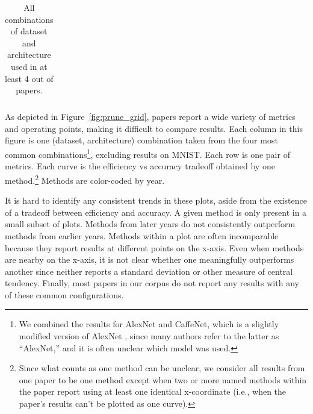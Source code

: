 \begin{table}[t]
\begin{centering}
\begin{tabular}{ll|c}
\end{tabular}
\end{centering}
\caption{All combinations of dataset and architecture used in at least 4 out of \npapers papers.
}
\label{tbl:common_combos}
\vspace*{1mm}
\end{table}

As depicted in Figure~\ref{fig:prune_grid}, papers report a wide variety of metrics and operating points, making it difficult to compare results. Each column in this figure is one (dataset, architecture) combination taken from the four most common combinations\footnote{We combined the results for AlexNet and CaffeNet, which is a slightly modified version of AlexNet \cite{caffenet}, since many authors refer to the latter as ``AlexNet,'' and it is often unclear which model was used.}, excluding results on MNIST. Each row is one pair of metrics. Each curve is the efficiency vs accuracy tradeoff obtained by one method.\footnote{Since what counts as one method can be unclear, we consider all results from one paper to be one method except when two or more named methods within the paper report using at least one identical x-coordinate (i.e., when the paper's results can't be plotted as one curve).} Methods are color-coded by year.

It is hard to identify any consistent trends in these plots, aside from the existence of a tradeoff between efficiency and accuracy. A given method is only present in a small subset of plots. Methods from later years do not consistently outperform methods from earlier years. Methods within a plot are often incomparable because they report results at different points on the x-axis. Even when methods are nearby on the x-axis, it is not clear whether one meaningfully outperforms another since neither reports a standard deviation or other measure of central tendency. Finally, most papers in our corpus do not report any results with any of these common configurations.

